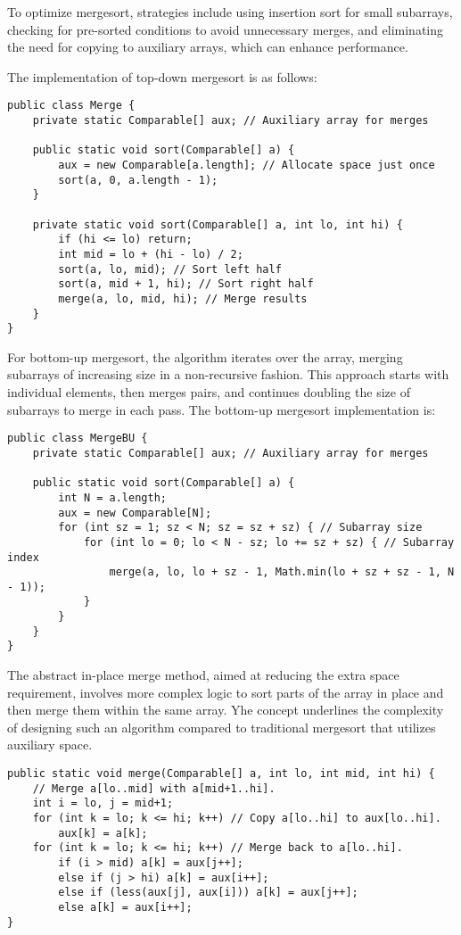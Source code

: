 \documentclass{article}
\begin{document}
To optimize mergesort, strategies include using insertion sort for small subarrays, checking for pre-sorted conditions to avoid unnecessary merges, and eliminating the need for copying to auxiliary arrays, which can enhance performance.

The implementation of top-down mergesort is as follows:

\begin{verbatim}
public class Merge {
    private static Comparable[] aux; // Auxiliary array for merges

    public static void sort(Comparable[] a) {
        aux = new Comparable[a.length]; // Allocate space just once
        sort(a, 0, a.length - 1);
    }

    private static void sort(Comparable[] a, int lo, int hi) {
        if (hi <= lo) return;
        int mid = lo + (hi - lo) / 2;
        sort(a, lo, mid); // Sort left half
        sort(a, mid + 1, hi); // Sort right half
        merge(a, lo, mid, hi); // Merge results
    }
}
\end{verbatim}

For bottom-up mergesort, the algorithm iterates over the array, merging subarrays of increasing size in a non-recursive fashion. This approach starts with individual elements, then merges pairs, and continues doubling the size of subarrays to merge in each pass. The bottom-up mergesort implementation is:

\begin{verbatim}
public class MergeBU {
    private static Comparable[] aux; // Auxiliary array for merges

    public static void sort(Comparable[] a) {
        int N = a.length;
        aux = new Comparable[N];
        for (int sz = 1; sz < N; sz = sz + sz) { // Subarray size
            for (int lo = 0; lo < N - sz; lo += sz + sz) { // Subarray index
                merge(a, lo, lo + sz - 1, Math.min(lo + sz + sz - 1, N - 1));
            }
        }
    }
}
\end{verbatim}

The abstract in-place merge method, aimed at reducing the extra space requirement, involves more complex logic to sort parts of the array in place and then merge them within the same array. Yhe concept underlines the complexity of designing such an algorithm compared to traditional mergesort that utilizes auxiliary space.

\begin{verbatim}
public static void merge(Comparable[] a, int lo, int mid, int hi) {
    // Merge a[lo..mid] with a[mid+1..hi].
    int i = lo, j = mid+1;
    for (int k = lo; k <= hi; k++) // Copy a[lo..hi] to aux[lo..hi].
        aux[k] = a[k];
    for (int k = lo; k <= hi; k++) // Merge back to a[lo..hi].
        if (i > mid) a[k] = aux[j++];
        else if (j > hi) a[k] = aux[i++];
        else if (less(aux[j], aux[i])) a[k] = aux[j++];
        else a[k] = aux[i++];
}
\end{verbatim}
\end{document}
